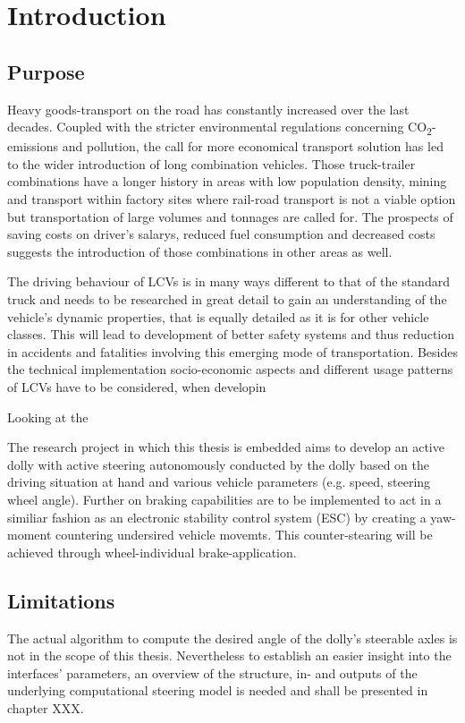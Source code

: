 \documentclass[ExampleMasters.tex]{subfiles}
\begin{document}
\clearpage	
\chapter{Introduction}
\label{chap:introduction}

\section{Purpose}
\label{sec:purpose}
Heavy goods-transport on the road has constantly increased over the last decades. Coupled with the stricter environmental regulations concerning CO\textsubscript{2}-emissions and pollution, the call for more economical transport solution has led to the wider introduction of long combination vehicles. Those truck-trailer combinations have a longer history in areas with low population density, mining and transport within factory sites where rail-road transport is not a viable option but transportation of large volumes and tonnages are called for. The prospects of saving costs on driver's salarys, reduced fuel consumption and decreased costs suggests the introduction of those combinations in other areas as well. 

The driving behaviour of LCVs is in many ways different to that of the standard truck and needs to be researched in great detail to gain an understanding of the vehicle's dynamic properties, that is equally detailed as it is for other vehicle classes. This will lead to development of better safety systems and thus reduction in accidents and fatalities involving this emerging mode of transportation. Besides the technical implementation socio-economic aspects and different usage patterns of LCVs have to be considered, when developin

Looking at the 

The research project in which this thesis is embedded aims to develop an active dolly with active steering autonomously conducted by the dolly based on the driving situation at hand and various vehicle parameters (e.g. speed, steering wheel angle). Further on braking capabilities are to be implemented to act in a similiar fashion as an electronic stability control system (ESC) by creating a yaw-moment countering undersired vehicle movemts. This counter-stearing will be achieved through wheel-individual brake-application. 

\section{Limitations}
\label{sec:limitations}
The actual algorithm to compute the desired angle of the dolly's steerable axles is not in the scope of this thesis. Nevertheless to establish an easier insight into the interfaces' parameters, an overview of the structure, in- and outputs of the underlying computational steering model is needed and shall be presented in chapter XXX. 
\end{document}

